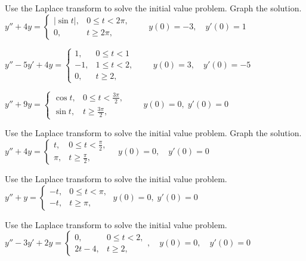 \documentclass{ximera}
\begin{document}
\begin{problem}\label{exer:8.5.6} Use the Laplace transform to solve the initial value problem.  Graph the solution. 
$y''+4y= \left\{\begin{array}{cl}|\sin
t|,&0\le t<2\pi,\\ 0,&t\ge 2\pi,\end{array}\right.\qquad
y(0)=-3,\quad y'(0)=1$
\end{problem}

\begin{problem}\label{exer:8.5.7} $y''-5y'+4y= \left\{\begin{array}{rl} 1,&0\le
t<1\\ -1,&1\le t<2,\\ 0,&t\ge 2,\end{array}\right.\qquad
y(0)=3,\quad y'(0)=-5$
\end{problem}

\begin{problem}\label{exer:8.5.8} $y''+9y= \left\{\begin{array}{cl} \cos
t,&0\le t<\frac{3\pi}{2},\\ \sin
t,&t\ge\frac{3\pi}{2},\end{array}\right.\qquad y(0)=0,\;  y'(0)=0$
\end{problem}

\begin{problem}\label{exer:8.5.9} Use the Laplace transform to solve the initial value problem.  Graph the solution. 
$y''+4y= \left\{\begin{array}{cl} t,&0\le
t<\frac{\pi}{2},\\ \pi,&t\ge\frac{\pi}{2},
\end{array}\right.\quad y(0)=0,\quad y'(0)=0$
\end{problem}

\begin{problem}\label{exer:8.5.10}
Use the Laplace transform to solve the initial value problem.
$y''+y=\left\{\begin{array}{cl}-t,&0\le t<\pi,
\\ -t,&t\ge\pi ,\end{array}\right.\;  y(0)=0,\;  y'(0)=0$
\end{problem}

\begin{problem}\label{exer:8.5.11} Use the Laplace transform to solve the initial value problem.
$y''-3y'+2y=\left\{\begin{array}{cl} 0,&0\le
t<2,\\2t-4,&t\ge 2,\end{array}\right. ,\quad y(0)=0,\quad y'(0)=0$
\end{problem}
\end{document}
